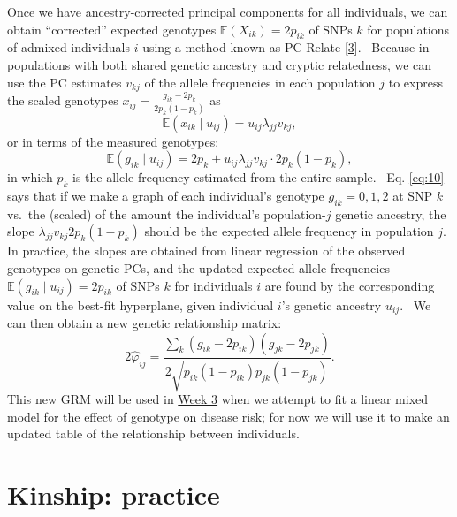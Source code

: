 \documentclass[
]{book}
\begin{document}
Once we have ancestry-corrected principal components for all individuals, we can obtain ``corrected'' expected genotypes \(\mathbb{E}\left(X_{ik}\right)=2p_{ik}\) of SNPs \(k\) for populations of admixed individuals \(i\) using a method known as PC-Relate {[}\protect\hyperlink{ref-conomos_model-free_2016}{3}{]}.~ Because in populations with both shared genetic ancestry and cryptic relatedness, we can use the PC estimates \(v_{kj}\) of the allele frequencies in each population \(j\) to express the scaled genotypes \(x_{ij}=\frac{g_{ik}-2p_k}{2p_k\left(1-p_k\right)}\) as\begin{equation}\mathbb{E}\left(x_{ik}\mid u_{ij}\right)=u_{ij}\lambda_{jj}v_{kj},\label{eq:9}\end{equation}or in terms of the measured genotypes:\begin{equation}\mathbb{E}\left(g_{ik}\mid u_{ij}\right)=2p_k+u_{ij}\lambda_{jj}v_{kj}\cdot 2p_k\left(1-p_k\right),\label{eq:10}\end{equation} in which \(p_k\) is the allele frequency estimated from the entire sample.~ Eq. \eqref{eq:10} says that if we make a graph of each individual's genotype \(g_{ik}=0,1,2\) at SNP \(k\) vs.~the (scaled) of the amount the individual's population-\(j\) genetic ancestry, the slope \(\lambda_{jj}v_{kj}2p_k\left(1-p_k\right)\) should be the expected allele frequency in population \(j\).~ In practice, the slopes are obtained from linear regression of the observed genotypes on genetic PCs, and the updated expected allele frequencies \(\mathbb{E}\left(g_{ik}\mid u_{ij}\right)=2p_{ik}\) of SNPs \(k\) for individuals \(i\) are found by the corresponding value on the best-fit hyperplane, given individual \(i\)'s genetic ancestry \(u_{ij}\).~ We can then obtain a new genetic relationship matrix:\begin{equation}2\hat{\varphi}_{ij}=\frac{\sum_k\left(g_{ik}-2p_{ik}\right)\left(g_{jk}-2p_{jk}\right)}{2\sqrt{p_{ik}\left(1-p_{ik}\right)p_{jk}\left(1-p_{jk}\right)}}.\label{eq:11}\end{equation}This new GRM will be used in \href{}{Week 3} when we attempt to fit a linear mixed model for the effect of genotype on disease risk; for now we will use it to make an updated table of the relationship between individuals.

\hypertarget{kinship-practice}{%
\section{Kinship: practice}\label{kinship-practice}}
\end{document}
